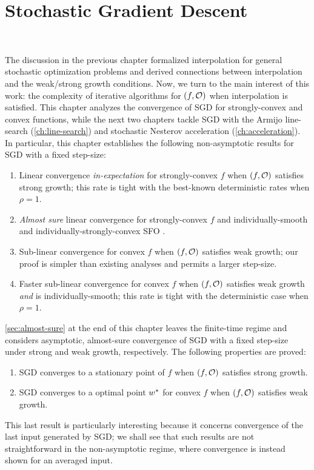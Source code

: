 
\chapter{Stochastic Gradient Descent}~\label{ch:sgd}

The discussion in the previous chapter formalized interpolation for general stochastic optimization problems and derived connections between interpolation and the weak/strong growth conditions.  
Now, we turn to the main interest of this work: the complexity of iterative algorithms for \( \rbr{f, \oracle{}} \) when interpolation is satisfied. 
This chapter analyzes the convergence of SGD for strongly-convex and convex functions, while the next two chapters tackle SGD with the Armijo line-search (\autoref{ch:line-search}) and stochastic Nesterov acceleration (\autoref{ch:acceleration}).
In particular, this chapter establishes the following non-asymptotic results for SGD with a fixed step-size: 
\begin{enumerate}
    \item Linear convergence \emph{in-expectation} for strongly-convex \( f \) when \( \rbr{f, \oracle{}} \) satisfies strong growth; this rate is tight with the best-known deterministic rates when \( \rho = 1 \).
    \item \emph{Almost sure} linear convergence for strongly-convex \( f \) and individually-smooth and individually-strongly-convex SFO \oracle{}. 
    \item Sub-linear convergence for convex \( f \) when \( \rbr{f, \oracle{}} \) satisfies weak growth; our proof is simpler than existing analyses and permits a larger step-size.
    \item Faster sub-linear convergence for convex \( f \) when \( \rbr{f, \oracle{}} \) satisfies weak growth \emph{and} \oracle{} is individually-smooth; this rate is tight with the deterministic case when \( \rho = 1 \).
\end{enumerate}
\autoref{sec:almost-sure} at the end of this chapter leaves the finite-time regime and considers asymptotic, almost-sure convergence of SGD with a fixed step-size under strong and weak growth, respectively.
The following properties are proved: 
\begin{enumerate}
    \item SGD converges to a stationary point of \( f \) when \( \rbr{f, \oracle{}} \) satisfies strong growth.
    \item SGD converges to a optimal point \( \wopt \) for convex \( f \) when \( \rbr{f, \oracle{}} \) satisfies weak growth.
\end{enumerate}
This last result is particularly interesting because it concerns convergence of the last input generated by SGD;
we shall see that such results are not straightforward in the non-asymptotic regime, where convergence is instead shown for an averaged input. 

